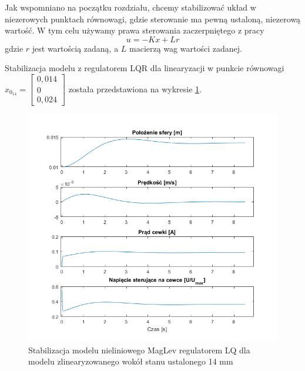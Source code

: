 Jak wspomniano na początku rozdziału, chcemy stabilizować układ w niezerowych punktach równowagi, gdzie sterowanie ma pewną ustaloną, niezerową wartość. W tym celu używamy prawa sterowania zaczerpniętego z pracy \cite{ReferenceTrackLQR}
\begin{equation}
u = -Kx + Lr
\end{equation}
gdzie $r$ jest wartością zadaną, a $L$ macierzą wag wartości zadanej.

Stabilizacja modelu z regulatorem LQR dla linearyzacji w punkcie równowagi $ x_{0_{14}} = \begin{bmatrix} 0,014 \\
0 \\
0,024
\end{bmatrix}
$ została przedstawiona na wykresie \ref{img:model_LQR}.

\begin{figure}[!htb]
\centering
\includegraphics[scale=0.85]{img/model_LQR_stabilizacja.png}
\caption{Stabilizacja modelu nieliniowego MagLev regulatorem LQ dla modelu zlinearyzowanego wokół stanu ustalonego 14 mm}
\label{img:model_LQR}
\end{figure}






